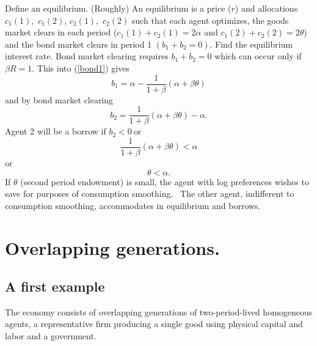 \documentclass{sebase}
\begin{document}
\pagebreak

Define an equilibrium. (Roughly) An equilibrium is a price ($r$) and
allocations $c_{1}\left( 1\right) ,$ $c_{1}\left( 2\right) $, $c_{2}\left(
1\right) ,$ $c_{2}\left( 2\right) $ such that each agent optimizes, the
goods market clears in each period ($c_{1}\left( 1\right) +c_{2}\left(
1\right) =2\alpha $ and $c_{1}\left( 2\right) +c_{2}\left( 2\right) =2\theta 
$) and the bond market clears in period 1 $\left( b_{1}+b_{2}=0\right) .$
Find the equilibrium interest rate. Bond market clearing requires $%
b_{1}+b_{2}=0$ which can occur only if $\beta R=1.$ This into (\ref{bond1})
gives%
\begin{equation*}
b_{1}=\alpha -\frac{1}{1+\beta }\left( \alpha +\beta \theta \right)
\end{equation*}%
and by bond market clearing 
\begin{equation*}
b_{2}=\frac{1}{1+\beta }\left( \alpha +\beta \theta \right) -\alpha .
\end{equation*}%
Agent 2 will be a borrow if $b_{2}<0\ $or 
\begin{equation*}
\frac{1}{1+\beta }\left( \alpha +\beta \theta \right) <\alpha
\end{equation*}%
or%
\begin{equation*}
\theta <\alpha .
\end{equation*}%
If $\theta $ (second period endowment) is small, the agent with log
preferences wishes to save for purposes of consumption smoothing. \ The
other agent, indifferent to consumption smoothing, accommodates in
equilibrium and borrows.\pagebreak

\section{Overlapping generations.}

\subsection{A first example}

The economy consists of overlapping generations of two-period-lived
homogeneous agents, a representative firm producing a single good using
physical capital and labor and a government.
\end{document}
